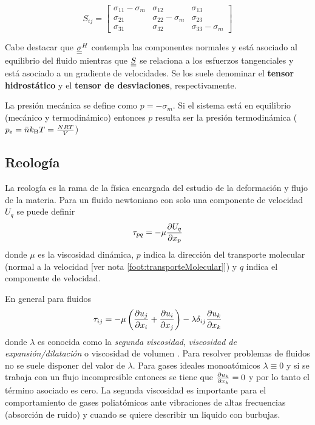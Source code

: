 \[
S_{ij}= \begin{bmatrix}
\sigma_{11}-\sigma_m & \sigma_{12} & \sigma_{13} \\
\sigma_{21} & \sigma_{22}-\sigma_m & \sigma_{23} \\
\sigma_{31} & \sigma_{32} & \sigma_{33}-\sigma_m 
\end{bmatrix}
\]

Cabe destacar que $\underline{\underline{\sigma}}^H$ contempla las componentes normales y está asociado al equilibrio del fluido mientras que $\underline{\underline{S}}$ se relaciona a los esfuerzos tangenciales y está asociado a un gradiente de velocidades. Se los suele denominar el \textbf{tensor hidrostático} y el \textbf{tensor de desviaciones}, respectivamente. 

La presión mecánica se define como $p=-\sigma_m$. Si el sistema está en equilibrio (mecánico y termodinámico) entonces $p$ resulta ser la presión termodinámica ($\pe=\moldens \boltzmann T=\frac{NRT}{V}$) \label{sec:presionmecanica}

\subsection{Reología} \label{sec:reologia}
La reología es la rama de la física encargada del estudio de la deformación y flujo de la materia. Para un fluido newtoniano con solo una componente de velocidad $U_q$ se puede definir
\begin{equation}
    \tau_{pq}=-\mu \frac{\partial U_q}{\partial x_p}
\end{equation}
donde $\mu$ es la viscosidad dinámica, $p$ indica la dirección del transporte molecular (normal a la velocidad [ver nota \ref{foot:transporteMolecular}]) y $q$ indica el componente de velocidad.

En general para fluidos
\begin{equation}
    \tau_{ij}=-\mu \left( \frac{\partial u_j}{\partial x_i}+\frac{\partial u_i}{\partial x_j}\right) -\lambda \delta_{ij} \frac{\partial u_k}{\partial x_k}
\end{equation}
donde $\lambda$ es conocida como la \textit{segunda viscosidad}, \textit{viscosidad de expansión/dilatación} o viscosidad de volumen \citep{durst2008fluid}. Para resolver problemas de fluidos no se suele disponer del valor de $\lambda$. Para gases ideales monoatómicos $\lambda \equiv 0$ y si se trabaja con un flujo incompresible entonces se tiene que $\frac{\partial u_k}{\partial x_k}=0$ y por lo tanto el término asociado es cero. La segunda viscosidad es importante para el comportamiento de gases poliatómicos ante vibraciones de altas frecuencias (absorción de ruido) y cuando se quiere describir un liquido con burbujas.

